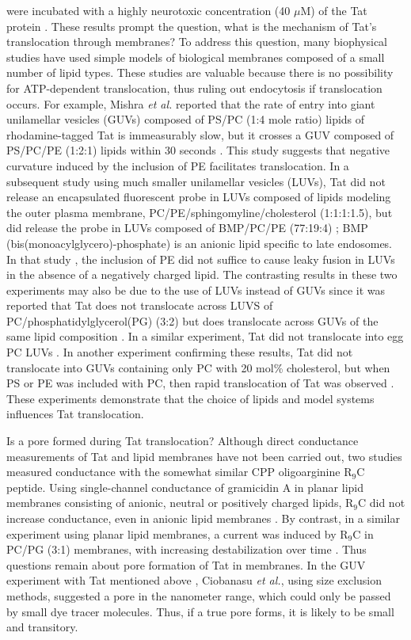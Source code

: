 were incubated with a highly neurotoxic concentration (40 $\mu$M) of the Tat protein 
\cite{Sabatier91}. 
These results prompt the question, what is the mechanism of Tat’s translocation through 
membranes?
To address this question, many biophysical studies have used simple models of
biological membranes composed of a small number of lipid types. These studies 
are valuable
because there is no possibility for ATP-dependent translocation, thus ruling 
out endocytosis if
translocation occurs. For example, Mishra \textit{et al.} reported that the rate of 
entry into giant
unilamellar vesicles (GUVs) composed of PS/PC
(1:4 mole ratio) lipids of rhodamine-tagged Tat
is immeasurably slow, but it crosses a GUV composed of PS/PC/PE (1:2:1) lipids 
within 30
seconds \cite{Mishra08}. 
This study suggests that negative curvature induced by the 
inclusion of PE facilitates translocation. 
In a subsequent study using much smaller unilamellar vesicles (LUVs),
Tat did not release an encapsulated fluorescent probe in LUVs composed of 
lipids modeling the outer plasma membrane, PC/PE/sphingomyline/cholesterol (1:1:1:1.5), 
but did release the probe in LUVs composed of BMP/PC/PE (77:19:4) \cite{Yang10}; 
BMP (bis(monoacylglycero)-phosphate) is an anionic lipid specific to late 
endosomes. In that study \cite{Yang10}, the inclusion of PE did not suffice to 
cause leaky fusion in LUVs in the absence of a negatively charged lipid. The 
contrasting results in these two experiments may also be due to the use of LUVs 
instead of GUVs since it was reported that Tat does not translocate across LUVS 
of PC/phosphatidylglycerol(PG) (3:2) but does translocate across GUVs of the same lipid composition 
\cite{Thoren04}. In a similar experiment, Tat did not translocate into egg PC
LUVs \cite{Kramer03}. In another experiment confirming these results, Tat did 
not translocate into GUVs containing only PC with 20 mol\% cholesterol, but 
when PS or PE was included with PC, then rapid translocation of Tat was observed 
\cite{Ciobanasu10}. These experiments demonstrate that the choice of lipids and 
model systems influences Tat translocation.

Is a pore formed during Tat translocation? Although direct conductance 
measurements of Tat and lipid membranes have not been carried out, two studies 
measured conductance with the somewhat similar CPP oligoarginine R$_9$C peptide. 
Using single-channel conductance of gramicidin A in planar lipid membranes 
consisting of anionic, neutral or positively charged lipids, R$_9$C did not 
increase conductance, even in anionic lipid membranes \cite{Gurnev13}. 
By contrast, in a similar experiment using planar lipid membranes, a current 
was induced by R$_9$C in PC/PG (3:1) membranes, with increasing destabilization 
over time \cite{Herce09}. Thus questions remain about pore formation of Tat in 
membranes. In the GUV experiment with Tat mentioned above \cite{Ciobanasu10},
Ciobanasu \textit{et al.}, using size exclusion methods, suggested a pore in the 
nanometer range, which could only be passed by small dye tracer molecules. Thus, 
if a true pore forms, it is likely to be small and transitory.

